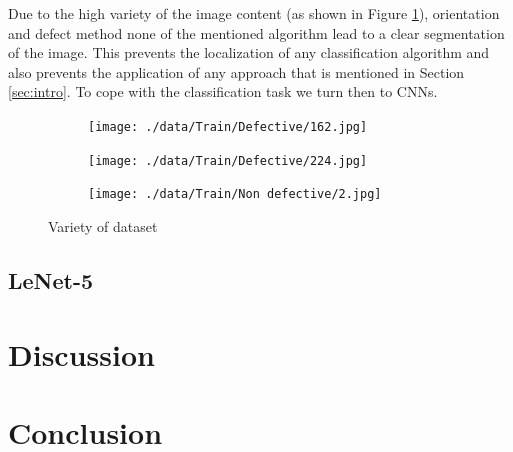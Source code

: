 \documentclass[10pt, final]{article}
\begin{document}
Due to the high variety of the image content (as shown in Figure \ref{fig:variety}),
orientation and defect method none of the mentioned algorithm lead to a clear segmentation of the image.
This prevents the localization of any classification algorithm and also prevents the application of any approach that
is mentioned in Section \ref{sec:intro}.
To cope with the classification task we turn then to CNNs.

\begin{figure}[!ht]
	\centering
	\begin{subfigure}{0.3\textwidth}
		\centering
		\texttt{[image: ./data/Train/Defective/162.jpg]}
	\end{subfigure}
	\begin{subfigure}{0.3\textwidth}
		\centering
		\texttt{[image: ./data/Train/Defective/224.jpg]}
	\end{subfigure}
	\begin{subfigure}{0.3\textwidth}
		\centering
		\texttt{[image: ./data/Train/Non defective/2.jpg]}
	\end{subfigure}
	\caption{Variety of dataset}
	\label{fig:variety}
\end{figure}

\subsection{LeNet-5}


\section{Discussion} \label{sec:discussion}
\section{Conclusion} \label{sec:conclusion}
\newpage
\listoffigures
\newpage
\listoftables
\newpage
\printbibliography
\end{document}
